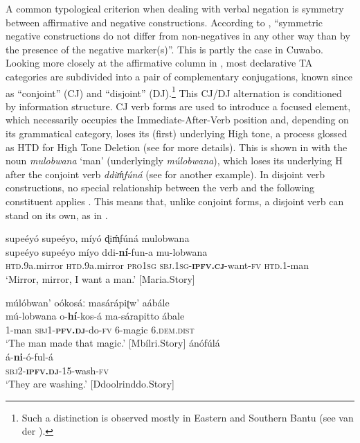 \documentclass[output=paper,colorlinks=true, citecolor=brown,draftmode]{langscibook}
\begin{document}
A common typological criterion when dealing with verbal negation is symmetry between affirmative and negative constructions.
According to \citet[556]{Miestamo2007}, “symmetric negative constructions do not differ from non-negatives in any other way than by the presence of the negative marker(s)”. This is partly the case in Cuwabo. Looking more closely at the affirmative column in , most declarative TA categories are subdivided into a pair of complementary conjugations, known since \citet{Meeussen1959} as “conjoint” (CJ) and “disjoint” (DJ).\footnote{Such a distinction is observed mostly in Eastern and Southern Bantu (see van der \citealt{WalHyman2017}).} This CJ/DJ alternation is conditioned by information structure. CJ verb forms are used to introduce a focused element, which necessarily occupies the Immediate-After-Verb position and, depending on its grammatical category, loses its (first) underlying High tone, a process glossed as HTD for High Tone Deletion (see  for more details). This is shown in  with the noun \textit{mulobwana} ‘man’ (underlyingly \textit{múlobwana}), which loses its underlying H after the conjoint verb \textit{ddiḿ̩fúná} (see  for another example). In disjoint verb constructions, no special relationship between the verb and the following constituent applies . This means that, unlike conjoint forms, a disjoint verb can stand on its own, as in .

\ea\label{ex:cuw:3} supeéyó supeéyo, míyó ɖiḿ̩fúná mulobwana\\
    \gll  supeéyo supeéyo míyo ddi-\textbf{ní}{}-fun-a mu-lobwana\\
           \textsc{htd}.9a.mirror \textsc{htd}.9a.mirror \textsc{pro1sg} \textsc{sbj.1sg}{}-\textbf{\textsc{ipfv}}\textbf{.\textsc{cj}}{}-want-\textsc{fv} \textsc{htd.1}{}-man\\
    \glt  ‘Mirror, mirror, I want a man.’ [Maria.Story]
\z 
           

\ea\label{ex:cuw:4}
    \ea\label{ex:cuw:4a}múlóbwan’ oókosáː masárápiʈw’ aábále  \\ 
        \gll mú-lobwana o-\textbf{hí}{}-kos-á ma-sárapitto ábale\\
               1-man \textsc{sbj1}{}-\textbf{\textsc{pfv}}\textbf{.\textsc{dj}}{}-do-\textsc{fv} 6-magic 6.\textsc{dem.dist}\\
        \glt  ‘The man made that magic.’ [Mbílri.Story]
    \ex\label{ex:cuw:4b}ánófúlá \\
        \gll á-\textbf{ni}{}-ó-ful-á \\
              \textsc{sbj2}{}-\textbf{\textsc{ipfv.dj}}\textsc{{}-15}{}-wash-\textsc{fv}\\
        \glt ‘They are washing.’ [Ddoolrinddo.Story]
    \z
\z 
              
\end{document}
